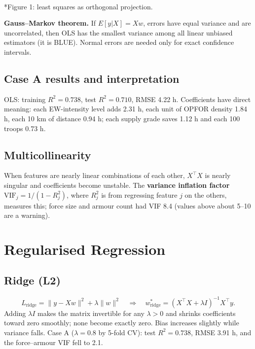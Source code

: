 \documentclass[11pt]{article}
\begin{document}
\begin{center}\\*{\small\color{GreyN}Figure 1: least squares as orthogonal projection.}\end{center}

\textbf{Gauss--Markov theorem.} If $E[y|X]=Xw$, errors have equal variance and are uncorrelated, then OLS has the smallest variance among all linear unbiased estimators (it is BLUE). Normal errors are needed only for exact confidence intervals.

\subsection{Case A results and interpretation}
OLS: training $R^2=0.738$, test $R^2=0.710$, RMSE 4.22 h. Coefficients have direct meaning: each EW-intensity level adds 2.31 h, each unit of OPFOR density 1.84 h, each 10 km of distance 0.94 h; each supply grade saves 1.12 h and each 100 troops 0.73 h.

\subsection{Multicollinearity}
When features are nearly linear combinations of each other, $X^\top X$ is nearly singular and coefficients become unstable. The \textbf{variance inflation factor} $\text{VIF}_j=1/(1-R_j^2)$, where $R_j^2$ is from regressing feature $j$ on the others, measures this; force size and armour count had VIF 8.4 (values above about 5--10 are a warning).

\section{Regularised Regression}
\subsection{Ridge (L2)}
\[L_{\text{ridge}}=\|y-Xw\|^2+\lambda\|w\|^2\quad\Rightarrow\quad w^*_{\text{ridge}}=(X^\top X+\lambda I)^{-1}X^\top y.\]
Adding $\lambda I$ makes the matrix invertible for any $\lambda>0$ and shrinks coefficients toward zero smoothly; none become exactly zero. Bias increases slightly while variance falls. Case A ($\lambda=0.8$ by 5-fold CV): test $R^2=0.738$, RMSE 3.91 h, and the force--armour VIF fell to 2.1.
\end{document}
